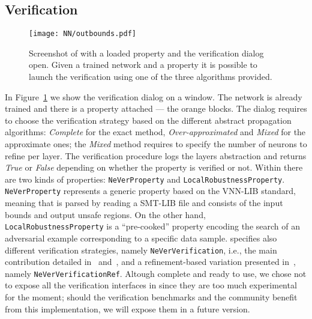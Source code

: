 \subsection{Verification}
%
\begin{figure}[t]
	\caption{\label{fig:never-verification} Screenshot of \nevertwo{} with a
		loaded property and the verification dialog open. Given a trained
		network and a property it is possible to launch the verification
		using one of the three algorithms provided.}
	\centering
	\texttt{[image: NN/outbounds.pdf]}
\end{figure}
%
In Figure~\ref{fig:never-verification} we show the verification dialog on a
\nevertwo{} window. The network is already trained and there is a property
attached --- the orange blocks. The dialog requires to choose the verification
strategy based on the different abstract propagation algorithms: \textit{Complete}
for the exact method, \textit{Over-approximated} and \textit{Mixed} for the
approximate ones; the \textit{Mixed} method requires to specify the number of
neurons to refine per layer. The verification procedure logs the layers abstraction
and returns \textit{True} or \textit{False} depending on whether the property is
verified or not. Within \pynever{} there are two kinds of properties: 
\texttt{NeVerProperty} and \texttt{LocalRobustnessProperty}. 
\texttt{NeVerProperty} represents a generic property based on the VNN-LIB 
standard, meaning that is parsed by reading a SMT-LIB file and consists of the
input bounds and output unsafe regions.
On the other hand, \texttt{LocalRobustnessProperty} is a ``pre-cooked” property
encoding the search of an adversarial example corresponding to a specific 
data sample. \pynever{} specifies also different verification strategies, namely
\texttt{NeVerVerification}, i.e., the main contribution detailed 
in~\cite{guidotti2021pynever} and~\cite{DBLP:conf/ecms/DemarchiGPT22}, and a 
refinement-based variation presented in~\cite{DBLP:conf/cpsschool/DemarchiG22}, 
namely \texttt{NeVerVerificationRef}. Altough complete and ready to use, we chose
not to expose all the verification interfaces in \nevertwo{} since they are too
much experimental for the moment; should the verification benchmarks and the 
community benefit from this implementation, we will expose them in a future
version.